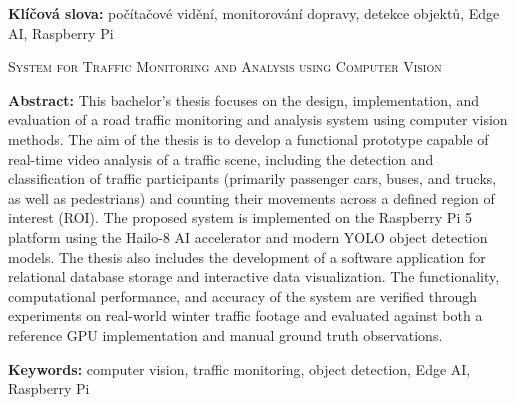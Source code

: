 \documentclass[male,czech,api_bc]{kitheses}
\newcommand{\nazeven}{System for Traffic Monitoring and Analysis using Computer Vision}
\begin{document}
\textbf{Klíčová slova:} počítačové vidění, monitorování dopravy, detekce objektů, Edge AI, Raspberry Pi

\bigskip

\textsc{\nazeven}

\textbf{Abstract:}
This bachelor's thesis focuses on the design, implementation, and evaluation of a road traffic monitoring and analysis system using computer vision methods. The aim of the thesis is to develop a functional prototype capable of real-time video analysis of a traffic scene, including the detection and classification of traffic participants (primarily passenger cars, buses, and trucks, as well as pedestrians) and counting their movements across a defined region of interest (ROI). The proposed system is implemented on the Raspberry Pi 5 platform using the Hailo-8 AI accelerator and modern YOLO object detection models. The thesis also includes the development of a software application for relational database storage and interactive data visualization. The functionality, computational performance, and accuracy of the system are verified through experiments on real-world winter traffic footage and evaluated against both a reference GPU implementation and manual ground truth observations.

\textbf{Keywords:} computer vision, traffic monitoring, object detection, Edge AI, Raspberry Pi

\tableofcontents
\clearpage

\newcommand{\lang}{cs}








\sloppy
\printbibliography[title=Seznam použitých zdrojů]
\appendix

\end{document}
